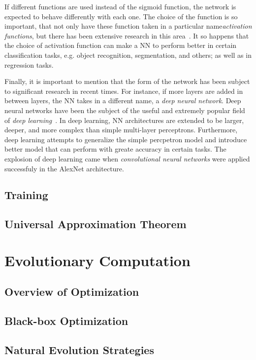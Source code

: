 If different functions are used instead of the sigmoid function, the network is expected to behave differently with each one. The choice of the function is so important, that not only have these function taken in a particular name\textemdash \emph{activation functions}\textemdash, but there has been extensive research in this area~\cite{chenUniversalApproximationNonlinear1995}. It so happens that the choice of activation function can make a NN to perform better in certain classification tasks, e.g. object recognition, segmentation, and others; as well as in regression tasks.

Finally, it is important to mention that the form of the network has been subject to significant research in recent times. For instance, if more layers are added in between layers, the NN takes in a different name, a \emph{deep neural network}. Deep neural networks have been the subject of the useful and extremely popular field of \emph{deep learning}~\cite{goodfellowDeepLearning2016}. In deep learning, NN architectures are extended to be larger, deeper, and more complex than simple multi-layer perceptrons. Furthermore, deep learning attempts to generalize the simple percpetron model and introduce better model that can perform with greate accuracy in certain tasks. The explosion of deep learning came when \emph{convolutional neural networks} were applied successfuly in the AlexNet architecture.

\subsection{Training}
\subsection{Universal Approximation Theorem}

\section{Evolutionary Computation}
\subsection{Overview of Optimization}
\subsection{Black-box Optimization}
\subsection{Natural Evolution Strategies}